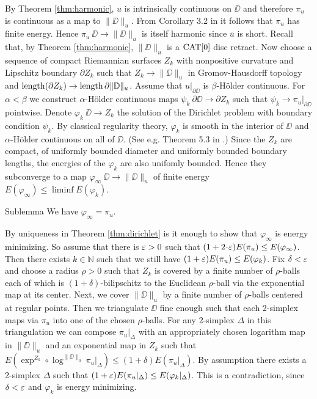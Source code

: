 \documentclass{article}
\begin{document}
By Theorem \ref{thm:harmonic}, $u$ is intrinsically continuous on $\DD$ and therefore $\pi_u$ is continuous as a map to $\|\DD\|_u$. 
From 
Corollary 3.2 in \cite{LW3} it follows that $\pi_u$ has finite energy. Hence $\pi_u\:\DD\to\|\DD\|_u$ is itself harmonic since $\bar u$
is short. Recall that, by Theorem \ref{thm:harmonic}, $\|\DD\|_u$ is a $\mathop{\rm CAT}\nolimits[0]$ disc retract. Now choose a sequence of compact Riemannian surfaces 
$Z_k$ with nonpositive curvature and Lipschitz boundary $\partial Z_k$
such that $Z_k\to\|\DD\|_u$ in Gromov-Hausdorff topology and $\mathop{\rm length}\nolimits(\partial Z_k)\to\mathop{\rm length}\nolimits \partial\|\mathbb{D}\|_u$. Assume that
$u|_{\partial\DD}$ is $\beta$-H\"older continuous. For $\alpha<\beta$ we construct $\alpha$-H\"older continuous maps 
$\psi_k\:\partial\DD\to\partial Z_k$ such that $\psi_k\to\pi_u|_{\partial\DD}$ pointwise. 
Denote $\varphi_k\:\DD\to Z_k$ the solution of the Dirichlet problem
with boundary condition $\psi_k$. By classical regularity theory, $\varphi_k$ is smooth in the interior of $\DD$ and $\alpha$-H\"older continuous
on all of $\DD$. 
(See e.g. Theorem 5.3 in \cite{S}.) 
Since the $Z_k$ are compact, of uniformly bounded diameter and uniformly bounded boundary lengths, the energies of the
$\varphi_k$ are also unifomly bounded. Hence they subconverge to a map $\varphi_\infty\:\DD\to \|\DD\|_u$ of finite energy $E(\varphi_\infty)\leq \liminf E(\varphi_k)$.
\begin{thm}{Sublemma}\label{sublem:minimizer}
We have $\varphi_\infty=\pi_u$.
\end{thm}
By uniqueness in Theorem \ref{thm:dirichlet} is it enough to show that $\varphi_\infty$ is energy minimizing. 
So assume that there is $\varepsilon>0$ such that $(1+2\cdot\eps)E(\pi_u)\leq E(\varphi_\infty)$. Then there exists $k\in\mathbb{N}$
such that we still have $(1+\varepsilon)E(\pi_u)\leq E(\varphi_k)$. Fix $\delta<\varepsilon$ and choose a radius $\rho>0$
such that $Z_k$ is covered by a finite number of $\rho$-balls each of which is $(1+\delta)$-bilipschitz to the Euclidean  
$\rho$-ball via the exponential map at its center. Next, we cover $\|\DD\|_u$ by a finite number of $\rho$-balls centered at regular points.
Then we triangulate $\DD$ fine enough such that each 2-simplex maps via $\pi_u$ into one of the chosen $\rho$-balls. For any 2-simplex
$\Delta$ in this triangulation we can compose $\pi_u|_\Delta$ with an appropriately chosen logarithm map in $\|\DD\|_u$ and an exponential map in 
$Z_k$ such that $E(\exp^{Z_k}\circ\log^{\|\DD\|_u}\pi_u|_\Delta)\leq (1+\delta)E(\pi_u|_\Delta)$. By assumption there exists a 2-simplex
$\Delta$ such that $(1+\varepsilon)E(\pi_u|_\Delta)\leq E(\varphi_k|_\Delta)$. This is a contradiction, since $\delta<\varepsilon$ and $\varphi_k$ is energy minimizing.
\qeds
\end{document}
